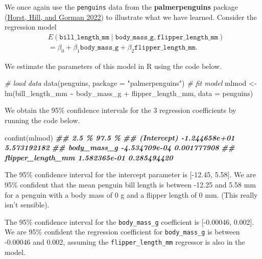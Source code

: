 \documentclass[
]{book}
\newenvironment{Shaded}{\begin{snugshade}}{\end{snugshade}}
\newcommand{\AttributeTok}[1]{\textcolor[rgb]{0.77,0.63,0.00}{#1}}
\newcommand{\CommentTok}[1]{\textcolor[rgb]{0.56,0.35,0.01}{\textit{#1}}}
\newcommand{\DocumentationTok}[1]{\textcolor[rgb]{0.56,0.35,0.01}{\textbf{\textit{#1}}}}
\newcommand{\FunctionTok}[1]{\textcolor[rgb]{0.00,0.00,0.00}{#1}}
\newcommand{\NormalTok}[1]{#1}
\newcommand{\OtherTok}[1]{\textcolor[rgb]{0.56,0.35,0.01}{#1}}
\newcommand{\SpecialCharTok}[1]{\textcolor[rgb]{0.00,0.00,0.00}{#1}}
\newcommand{\StringTok}[1]{\textcolor[rgb]{0.31,0.60,0.02}{#1}}
\theoremstyle{definition}
\theoremstyle{definition}
\theoremstyle{definition}
\theoremstyle{definition}
\theoremstyle{remark}
\begin{document}
We once again use the \texttt{penguins} data from the \textbf{palmerpenguins}
package (\protect\hyperlink{ref-R-palmerpenguins}{Horst, Hill, and Gorman 2022}) to illustrate what we have learned. Consider
the regression model
\[
\begin{aligned}
&E(\mathtt{bill\_length\_mm}\mid \mathtt{body\_mass\_g}, \mathtt{flipper\_length\_mm}) \\
&=\beta_0+\beta_1 \mathtt{body\_mass\_g} + \beta_2 \mathtt{flipper\_length\_mm}.
\end{aligned}
\]

We estimate the parameters of this model in R using the code below.

\begin{Shaded}
\begin{Highlighting}[]
\CommentTok{\# load data}
\FunctionTok{data}\NormalTok{(penguins, }\AttributeTok{package =} \StringTok{"palmerpenguins"}\NormalTok{)}
\CommentTok{\# fit model}
\NormalTok{mlmod }\OtherTok{\textless{}{-}} \FunctionTok{lm}\NormalTok{(bill\_length\_mm }\SpecialCharTok{\textasciitilde{}}\NormalTok{ body\_mass\_g }\SpecialCharTok{+}\NormalTok{ flipper\_length\_mm, }\AttributeTok{data =}\NormalTok{ penguins)}
\end{Highlighting}
\end{Shaded}

We obtain the 95\% confidence intervals for the 3 regression coefficients
by running the code below.

\begin{Shaded}
\begin{Highlighting}[]
\FunctionTok{confint}\NormalTok{(mlmod)}
\DocumentationTok{\#\#                           2.5 \%      97.5 \%}
\DocumentationTok{\#\# (Intercept)       {-}1.244658e+01 5.573192182}
\DocumentationTok{\#\# body\_mass\_g       {-}4.534709e{-}04 0.001777908}
\DocumentationTok{\#\# flipper\_length\_mm  1.582365e{-}01 0.285494420}
\end{Highlighting}
\end{Shaded}

The 95\% confidence interval for the intercept parameter is {[}-12.45,
5.58{]}. We are 95\% confident that the mean penguin bill length is between
-12.25 and 5.58 mm for a penguin with a body mass of 0 g and a flipper
length of 0 mm. (This really isn't sensible).

The 95\% confidence interval for the \texttt{body\_mass\_g} coefficient is
{[}-0.00046, 0.002{]}. We are 95\% confident the regression coefficient for
\texttt{body\_mass\_g} is between -0.00046 and 0.002, assuming the
\texttt{flipper\_length\_mm} regressor is also in the model.
\end{document}
